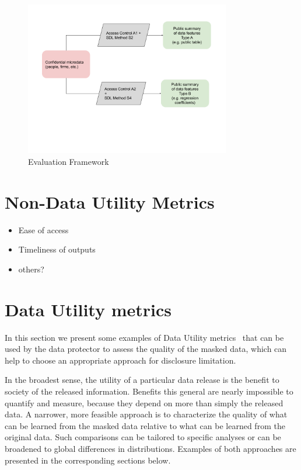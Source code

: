 \documentclass[12pt]{article}
\begin{document}
\begin{figure}
    \centering
\includegraphics[width=0.8\textwidth]{SDL+Access control.png}
    \caption{Evaluation Framework}
    \label{fig:framework}
\end{figure}

\section{Non-Data Utility Metrics}\label{sec:other_metrics}
\begin{itemize}
    \item Ease of access
    \item Timeliness of outputs
    \item others?
\end{itemize}

\section{Data Utility metrics} \label{du_metrics}
In this section we present some examples of Data Utility metrics \DU\ that can be used by the data protector to assess the quality of the masked data, which can help to choose an appropriate approach for disclosure limitation.

In the broadest sense, the utility of a particular data release is the
benefit to society of the released information. Benefits this general
are nearly impossible to quantify and measure, because they depend on
more than simply the released data. A narrower, more feasible approach
is to characterize the quality of what can be learned from the masked
data relative to what can be learned from the original data. Such
comparisons can be tailored to specific analyses or can be broadened
to global differences in distributions. Examples of both approaches are presented in the corresponding sections below.
\end{document}
